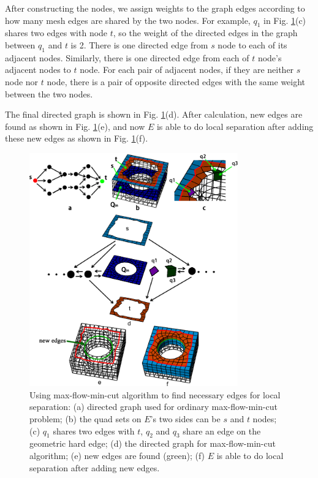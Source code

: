 \documentclass[final,5p,times,twocolumn]{elsarticle}
\begin{document}
After constructing the nodes, we assign weights to the graph edges according to how many mesh edges are shared by the two nodes. For example, $q_1$ in Fig. \ref{fig:max_flow_graph}(c) shares two edges with node $t$, so the weight of the directed edges in the graph between $q_1$ and $t$ is 2. There is one directed edge from $s$ node to each of its adjacent nodes. Similarly, there is one directed edge from each of $t$ node’s adjacent nodes to $t$ node. For each pair of adjacent nodes, if they are neither $s$ node nor $t$ node, there is a pair of opposite directed edges with the same weight between the two nodes.

The final directed graph is shown in Fig. \ref{fig:max_flow_graph}(d). After calculation, new edges are found as shown in Fig. \ref{fig:max_flow_graph}(e), and now $E$ is able to do local separation after adding these new edges as shown in  Fig. \ref{fig:max_flow_graph}(f).

\begin{figure}[htbp]
\begin{center}
\includegraphics[width=9cm]{max_flow_graph.png}
\caption{Using max-flow-min-cut algorithm to find necessary edges for local separation: (a) directed graph used for ordinary max-flow-min-cut problem; (b) the quad sets on $E$'s two sides can be $s$ and $t$ nodes; (c) $q_1$ shares two edges with $t$, $q_2$ and $q_3$ share an edge on the geometric hard edge; (d) the directed graph for max-flow-min-cut algorithm; (e) new edges are found (green); (f) $E$ is able to do local separation after adding new edges.}
\label{fig:max_flow_graph}
\end{center}
\end{figure}
\end{document}
